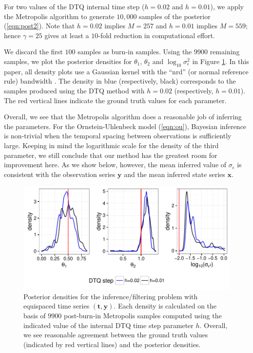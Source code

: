 \documentclass[wcp]{jmlr}
\begin{document}
For two values of the DTQ internal time step ($h = 0.02$ and
$h=0.01$), we apply the Metropolis algorithm to generate $10,000$
samples of the posterior (\ref{eqn:post2}).  Note that $h=0.02$
implies $M=257$ and $h=0.01$ implies $M=559$; hence $\gamma=25$
gives at least a $10$-fold reduction in computational effort.

We discard the first $100$ samples as burn-in samples.
Using the $9900$ remaining samples, we plot the posterior densities for
$\theta_1$, $\theta_2$ and $\log_{10} \sigma_\epsilon^2$ in Figure
\ref{fig:post_equi}.  In this paper, all density plots use a Gaussian
kernel with the ``nrd'' (or normal reference rule) bandwidth
\citep{Scott2015}.  The density in blue (respectively, black)
corresponds to the samples produced using the DTQ method with $h=0.02$
(respectively, $h=0.01$).  The red vertical lines indicate the ground
truth values for each parameter.

Overall, we see that the Metropolis algorithm does a reasonable job of
inferring the parameters.  For the Ornstein-Uhlenbeck model
(\ref{eqn:ou}), Bayesian inference is non-trivial when the temporal
spacing between observations is sufficiently large.  Keeping in mind
the logarithmic scale for the density of the third parameter, we still
conclude that our method has the greatest room for improvement here.
As we show below, however, the mean inferred value of
$\sigma_\epsilon$ is consistent with the observation series
$\mathbf{y}$ and the mean inferred state series $\mathbf{x}$.

\begin{figure}[th]
\begin{center}
\includegraphics[width=6in]{post_equi}
\end{center}
\vspace{-0.25in}
\caption{Posterior densities for the inference/filtering problem with
  equispaced time series $(\mathbf{t},\mathbf{y})$.  Each density is
  calculated on the basis of $9900$ post-burn-in Metropolis samples
  computed  using the indicated value of the internal DTQ time step
  parameter $h$.  Overall, we see reasonable agreement between the
  ground truth values (indicated by red vertical lines) and the
  posterior densities.}
\label{fig:post_equi}
\end{figure}
\end{document}
